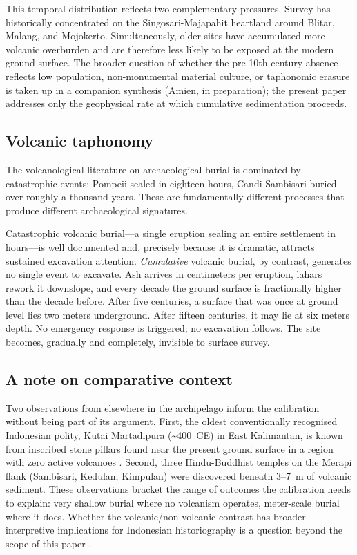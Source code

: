 \documentclass[12pt,a4paper]{article}
\begin{document}
This temporal distribution reflects two complementary pressures. Survey has historically concentrated on the Singosari-Majapahit heartland around Blitar, Malang, and Mojokerto. Simultaneously, older sites have accumulated more volcanic overburden and are therefore less likely to be exposed at the modern ground surface. The broader question of whether the pre-10th century absence reflects low population, non-monumental material culture, or taphonomic erasure is taken up in a companion synthesis (Amien, in preparation); the present paper addresses only the geophysical rate at which cumulative sedimentation proceeds.

\subsection{Volcanic taphonomy}

The volcanological literature on archaeological burial is dominated by catastrophic events: Pompeii sealed in eighteen hours, Candi Sambisari buried over roughly a thousand years. These are fundamentally different processes that produce different archaeological signatures.

Catastrophic volcanic burial---a single eruption sealing an entire settlement in hours---is well documented \citep{sigurdsson1985,doumas1983,sheets1992} and, precisely because it is dramatic, attracts sustained excavation attention. \textit{Cumulative} volcanic burial, by contrast, generates no single event to excavate. Ash arrives in centimeters per eruption, lahars rework it downslope, and every decade the ground surface is fractionally higher than the decade before. After five centuries, a surface that was once at ground level lies two meters underground. After fifteen centuries, it may lie at six meters depth. No emergency response is triggered; no excavation follows. The site becomes, gradually and completely, invisible to surface survey.

\subsection{A note on comparative context}

Two observations from elsewhere in the archipelago inform the calibration without being part of its argument. First, the oldest conventionally recognised Indonesian polity, Kutai Martadipura (\textasciitilde400~CE) in East Kalimantan, is known from inscribed stone pillars found near the present ground surface in a region with zero active volcanoes \citep{vogel1918,coedes1968,miksic2004}. Second, three Hindu-Buddhist temples on the Merapi flank (Sambisari, Kedulan, Kimpulan) were discovered beneath 3--7~m of volcanic sediment. These observations bracket the range of outcomes the calibration needs to explain: very shallow burial where no volcanism operates, meter-scale burial where it does. Whether the volcanic/non-volcanic contrast has broader interpretive implications for Indonesian historiography is a question beyond the scope of this paper \citep[see][]{amien_synthesis_forthcoming}.
\end{document}
